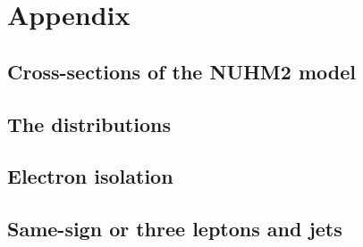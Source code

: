 \documentclass[hyperlinks]{outhesis}
\begin{document}

\clearpage


%


\clearpage

\appendix
\part*{Appendix}

\chapter{Cross-sections of the NUHM2 model}
\label{app:cross_sections}


\chapter{The distributions}
\label{app:distributions}
\graphicspath{{figures/distributions/}}


\chapter{Electron isolation}
\label{app:electron_isolation}
\graphicspath{{figures/electron_isolation/}}


\chapter{Same-sign or three leptons and jets}
\label{app:ss3l}
\graphicspath{{figures/ss3l/}}

\end{document}
